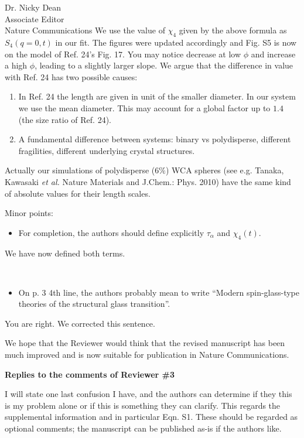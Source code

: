 \documentclass[a4paper, rebuttal, parskip=true, firsthead=false, fromemail=true, foldmarks=false]{scrlttr2}
\begin{document}
\begin{letter}{Dr. Nicky Dean\\
Associate Editor\\
Nature Communications}
We use the value of $\chi_4$ given by the above formula as $S_4(q=0,t)$ in our fit. The figures were updated accordingly and Fig. S5 is now on the model of Ref. 24's Fig. 17. You may notice decrease at low $\phi$ and increase a high $\phi$, leading to a slightly larger slope. We argue that the difference in value with Ref. 24 has two possible causes:
\begin{enumerate}
\item In Ref. 24 the length are given in unit of the smaller diameter. In our system we use the mean diameter. This may account for a global factor up to $1.4$ (the size ratio of Ref. 24).
\item A fundamental difference between systems: binary vs polydisperse, different fragilities, different underlying crystal structures.
\end{enumerate} 
Actually our simulations of polydisperse ($6\%$) WCA spheres (see e.g. Tanaka, Kawasaki \emph{et al.} Nature Materials and J.Chem.: Phys. 2010) have the same kind of absolute values for their length scales.

\begin{quotationi}
Minor points:
\begin{itemize}
\item For completion, the authors should define explicitly $\tau_\alpha$ and $\chi_4(t)$.
\end{itemize}
\end{quotationi}
We have now defined both terms.

\begin{quotationi}
~
\begin{itemize}
\item On p. 3 4th line, the authors probably mean to write ``Modern spin-glass-type theories of the structural glass transition''.
\end{itemize}
\end{quotationi}
You are right. We corrected this sentence.

We hope that the Reviewer would think that the revised manuscript has been much improved and is now suitable for publication in Nature Communications. 
 
\clearpage

\textsf{\textbf{Replies to the comments of Reviewer \#3}}

\begin{quotationi}
I will state one last confusion I have, and the authors can determine if they this is my problem alone or if this is something they can clarify. This regards the supplemental information and in particular Eqn. S1. These should be regarded as optional comments; the manuscript can be published as-is if the authors like.
\end{quotationi}


\end{letter}
\end{document}
